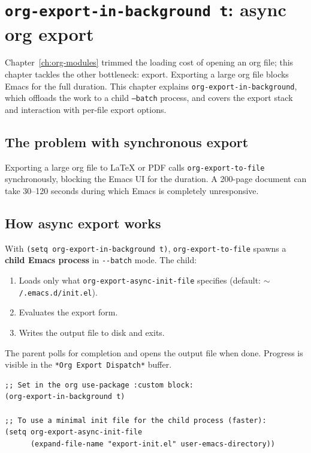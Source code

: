 \chapter{\texttt{org-export-in-background t}: async org export}
\label{ch:org-export}
\minitoc\label{org-export-in-background-t-async-org-export}

Chapter~\ref{ch:org-modules} trimmed the loading cost of opening an
org file; this chapter tackles the other bottleneck: export.
Exporting a large org file blocks Emacs for the full duration.  This chapter explains \texttt{org-export-in-background}, which
offloads the work to a child \texttt{--batch} process, and covers the
export stack and interaction with per-file export options.

\section{The problem with synchronous export}\label{the-problem-with-synchronous-export}

Exporting a large org file to LaTeX or PDF calls \texttt{org-export-to-file} synchronously, blocking the Emacs UI for the duration. A 200-page document can take 30--120 seconds during which Emacs is completely unresponsive.

\section{How async export works}\label{how-async-export-works}

With \texttt{(setq org-export-in-background t)}, \texttt{org-export-to-file} spawns a \textbf{child Emacs process} in \texttt{-\/-batch} mode. The child:

\begin{enumerate}
\item Loads only what \texttt{org-export-async-init-file} specifies (default: \texttt{$\sim$/.emacs.d/init.el}).
\item Evaluates the export form.
\item Writes the output file to disk and exits.
\end{enumerate}

The parent polls for completion and opens the output file when done. Progress is visible in the \texttt{*Org Export Dispatch*} buffer.

\begin{verbatim}
;; Set in the org use-package :custom block:
(org-export-in-background t)

;; To use a minimal init file for the child process (faster):
(setq org-export-async-init-file
      (expand-file-name "export-init.el" user-emacs-directory))
\end{verbatim}

